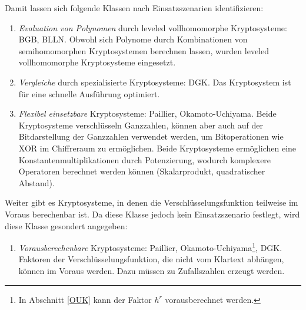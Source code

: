 Damit lassen sich folgende Klassen nach Einsatzszenarien identifizieren:
\begin{enumerate}
	\item \textit{Evaluation von Polynomen} durch leveled vollhomomorphe Kryptosysteme: BGB, BLLN. Obwohl sich Polynome durch Kombinationen von semihomomorphen Kryptosystemen berechnen lassen, wurden leveled vollhomomorphe Kryptosysteme eingesetzt.
	\item  \textit{Vergleiche} durch spezialisierte Kryptosysteme: DGK. Das Kryptosystem ist für eine schnelle Ausführung optimiert.
	\item \textit{Flexibel einsetzbare} Kryptosysteme: Paillier, Okamoto-Uchiyama. Beide Kryptosysteme verschlüsseln Ganzzahlen, können aber auch auf der Bitdarstellung der Ganzzahlen verwendet werden, um Bitoperationen wie XOR im Chiffreraum zu ermöglichen. Beide Kryptosysteme ermöglichen eine Konstantenmultiplikationen durch Potenzierung, wodurch komplexere Operatoren berechnet werden können (Skalarprodukt, quadratischer Abstand).
\end{enumerate}
Weiter gibt es Kryptosysteme, in denen die Verschlüsselungsfunktion teilweise im Voraus berechenbar ist. Da diese Klasse jedoch kein Einsatzszenario festlegt, wird diese Klasse gesondert angegeben: 
\begin{enumerate}
	 \item[\color{NavyBlue}(4.)] \textit{Vorausberechenbare} Kryptosysteme: Paillier, Okamoto-Uchiyama\footnote{In Abschnitt \ref{OUK} kann der Faktor $h^r$ vorausberechnet werden.}, DGK. Faktoren der Verschlüsselungsfunktion, die nicht vom Klartext abhängen, können im Voraus werden. Dazu müssen zu Zufallszahlen erzeugt werden.
\end{enumerate}









